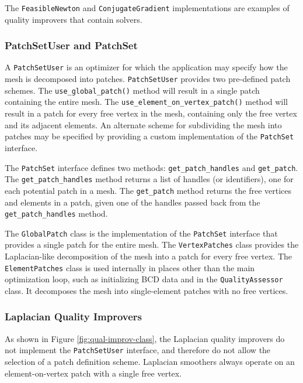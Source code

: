 \documentclass{article}
\begin{document}
The \texttt{FeasibleNewton} and \texttt{ConjugateGradient} implementations are examples of quality improvers that contain solvers.

\subsubsection{PatchSetUser and PatchSet}

A \texttt{PatchSetUser} is an optimizer for which the application may specify how the mesh is decomposed into patches.  \texttt{PatchSetUser} provides two pre-defined patch schemes.  The \texttt{use\_global\_patch()} method will result in a single patch containing the entire mesh.  The \texttt{use\_element\_on\_vertex\_patch()} method will result in a patch for every free vertex in the mesh, containing only the free vertex and its adjacent elements.  An alternate scheme for subdividing the mesh into patches may be specified by providing a custom implementation of the \texttt{PatchSet} interface.

The \texttt{PatchSet} interface defines two methods: \texttt{get\_patch\_handles} and \texttt{get\_patch}.  The \texttt{get\_patch\_handles} method returns a list of handles (or identifiers), one for each potential patch in a mesh.  The \texttt{get\_patch} method returns the free vertices and elements in a patch, given one of the handles passed back from the \texttt{get\_patch\_handles} method.

The \texttt{GlobalPatch} class is the implementation of the \texttt{PatchSet} interface that provides a single patch for the entire mesh.  The \texttt{VertexPatches} class provides the Laplacian-like decomposition of the mesh into a patch for every free vertex.  The \texttt{ElementPatches} class is used internally in places other than the main optimization loop, such as initializing BCD data and in the \texttt{QualityAssessor} class.  It decomposes the mesh into single-element patches with no free vertices.

\subsubsection{Laplacian Quality Improvers}

As shown in Figure \ref{fig:qual-improv-class}, the Laplacian quality improvers do not implement the \texttt{PatchSetUser} interface, and therefore do not allow the selection of a patch definition scheme.  Laplacian smoothers always operate on an element-on-vertex patch with a single free vertex.
\end{document}
